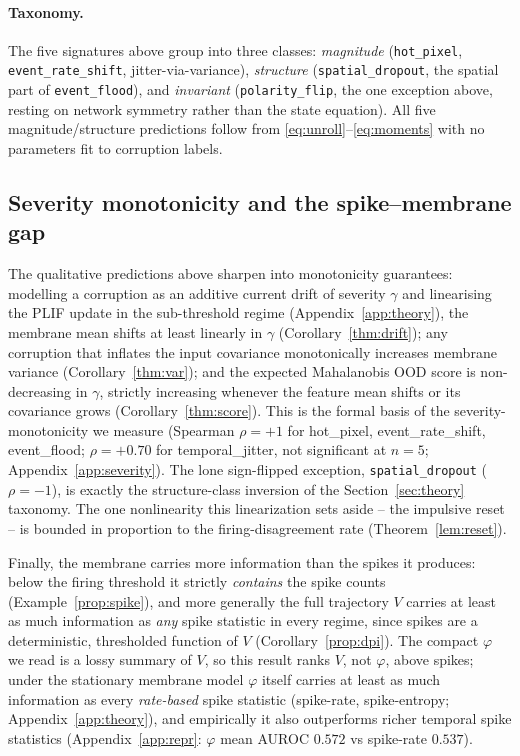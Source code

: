 ﻿\documentclass{article} %
\theoremstyle{remark}
\begin{document}
\paragraph{Taxonomy.}
The five signatures above group into three classes: \emph{magnitude} (\texttt{hot\_pixel},
\texttt{event\_rate\_shift}, jitter-via-variance), \emph{structure} (\texttt{spatial\_dropout}, the
spatial part of \texttt{event\_flood}), and \emph{invariant} (\texttt{polarity\_flip}, the one
exception above, resting on network symmetry rather than the state equation). All five
magnitude/structure predictions follow from \eqref{eq:unroll}--\eqref{eq:moments} with no
parameters fit to corruption labels.

\subsection{Severity monotonicity and the spike--membrane gap}
\label{sec:theory-monotone}
The qualitative predictions above sharpen into monotonicity guarantees: modelling a corruption as
an additive current drift of severity $\gamma$ and linearising the PLIF update in the sub-threshold
regime (Appendix~\ref{app:theory}), the membrane mean shifts at least linearly in $\gamma$
(Corollary~\ref{thm:drift}); any corruption that inflates the input covariance monotonically
increases membrane variance (Corollary~\ref{thm:var}); and the expected Mahalanobis OOD score is
non-decreasing in $\gamma$, strictly increasing whenever the feature mean shifts or its covariance
grows (Corollary~\ref{thm:score}). This is the formal basis of the severity-monotonicity we measure
(Spearman $\rho=+1$ for hot\_pixel, event\_rate\_shift, event\_flood; $\rho=+0.70$ for
temporal\_jitter, not significant at $n=5$; Appendix~\ref{app:severity}). The lone sign-flipped
exception, \texttt{spatial\_dropout} ($\rho=-1$), is exactly the structure-class inversion of the
Section~\ref{sec:theory} taxonomy. The one nonlinearity this linearization sets aside -- the
impulsive reset -- is bounded in proportion to the firing-disagreement rate (Theorem~\ref{lem:reset}).

Finally, the membrane carries more information than the spikes it produces: below the firing
threshold it strictly \emph{contains} the spike counts (Example~\ref{prop:spike}), and more
generally the full trajectory $V$ carries at least as much information as \emph{any} spike statistic
in every regime, since spikes are a deterministic, thresholded function of $V$
(Corollary~\ref{prop:dpi}). The compact $\varphi$ we read is a lossy summary of $V$, so this result
ranks $V$, not $\varphi$, above spikes; under the stationary membrane model $\varphi$ itself carries
at least as much information as every \emph{rate-based} spike statistic (spike-rate, spike-entropy;
Appendix~\ref{app:theory}), and empirically it also outperforms richer temporal spike statistics
(Appendix~\ref{app:repr}: $\varphi$ mean AUROC $0.572$ vs spike-rate $0.537$).
\end{document}
